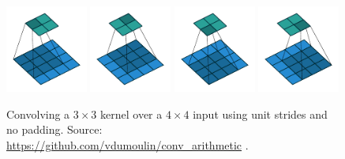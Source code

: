 \begin{itemize}
    \begin{figure}
    \centering
    \includegraphics[width=0.24\textwidth]{Images/Background/Convolution/no_padding_no_strides_00.pdf}
    \includegraphics[width=0.24\textwidth]{Images/Background/Convolution/no_padding_no_strides_01.pdf}
    \includegraphics[width=0.24\textwidth]{Images/Background/Convolution/no_padding_no_strides_02.pdf}
    \includegraphics[width=0.24\textwidth]{Images/Background/Convolution/no_padding_no_strides_03.pdf}
    \caption[Unit strides and no padding convolution]{Convolving a $3 \times 3$ kernel over a $4 \times 4$ input using unit strides and no padding. Source: \url{https://github.com/vdumoulin/conv_arithmetic} \cite{trans-conv}.}
    \label{fig:no_padding_no_strides}
    \end{figure}
    

\end{itemize}
